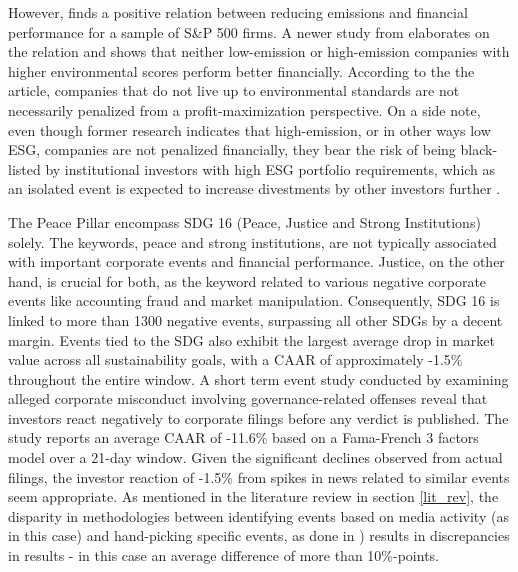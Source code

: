 However, \cite{hart1996does} finds a positive relation between reducing emissions and financial performance for a sample of S\&P 500 firms. A newer study from \cite{being_green} elaborates on the relation and shows that neither low-emission or high-emission companies with higher environmental scores perform better financially. According to the the article, companies that do not live up to environmental standards are not necessarily penalized from a profit-maximization perspective. On a side note, even though former research indicates that high-emission, or in other ways low ESG, companies are not penalized financially, they bear the risk of being black-listed by institutional investors with high ESG portfolio requirements, which as an isolated event is expected to increase divestments by other investors further \cite{dell2021norwegian}. 

The Peace Pillar encompass SDG 16 (Peace, Justice and Strong Institutions) solely. The keywords, peace and strong institutions, are not typically associated with important corporate events and financial performance. Justice, on the other hand, is crucial for both, as the keyword related to various negative corporate events like accounting fraud and market manipulation. Consequently, SDG 16 is linked to more than 1300 negative events, surpassing all other SDGs by a decent margin. Events tied to the SDG also exhibit the largest average drop in market value across all sustainability goals, with a CAAR of approximately -1.5\% throughout the entire window. A short term event study conducted by \cite{bauer2010misdeeds} examining alleged corporate misconduct involving governance-related offenses reveal that investors react negatively to corporate filings before any verdict is published. The study reports an average CAAR of -11.6\% based on a Fama-French 3 factors model over a 21-day window. Given the significant declines observed from actual filings, the investor reaction of -1.5\% from spikes in news related to similar events seem appropriate. As mentioned in the literature review in section \ref{lit_rev}, the disparity in methodologies between identifying events based on media activity (as in this case) and hand-picking specific events, as done in \citeauthor{bauer2010misdeeds}) results in discrepancies in results - in this case an average difference of more than 10\%-points. 

